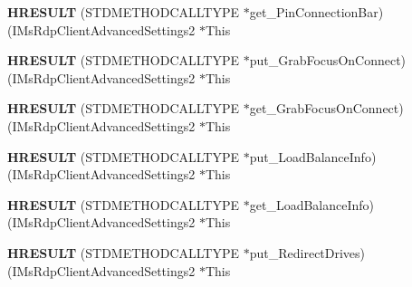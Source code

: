 \begin{DoxyCompactItemize}
\item 
\mbox{\label{struct_i_ms_rdp_client_advanced_settings2_vtbl_ad4f25ea9bf108e4c06acb5022e891fb0}} 
{\bfseries H\+R\+E\+S\+U\+LT} (S\+T\+D\+M\+E\+T\+H\+O\+D\+C\+A\+L\+L\+T\+Y\+PE $\ast$get\+\_\+\+Pin\+Connection\+Bar)(I\+Ms\+Rdp\+Client\+Advanced\+Settings2 $\ast$This
\item 
\mbox{\label{struct_i_ms_rdp_client_advanced_settings2_vtbl_aef44330913aeaa487c2fe85146e5cdf3}} 
{\bfseries H\+R\+E\+S\+U\+LT} (S\+T\+D\+M\+E\+T\+H\+O\+D\+C\+A\+L\+L\+T\+Y\+PE $\ast$put\+\_\+\+Grab\+Focus\+On\+Connect)(I\+Ms\+Rdp\+Client\+Advanced\+Settings2 $\ast$This
\item 
\mbox{\label{struct_i_ms_rdp_client_advanced_settings2_vtbl_a691e3f4879fa7ddb300e7033fb3df2b7}} 
{\bfseries H\+R\+E\+S\+U\+LT} (S\+T\+D\+M\+E\+T\+H\+O\+D\+C\+A\+L\+L\+T\+Y\+PE $\ast$get\+\_\+\+Grab\+Focus\+On\+Connect)(I\+Ms\+Rdp\+Client\+Advanced\+Settings2 $\ast$This
\item 
\mbox{\label{struct_i_ms_rdp_client_advanced_settings2_vtbl_a34c58ef6e8d8c506f66789017cc3a981}} 
{\bfseries H\+R\+E\+S\+U\+LT} (S\+T\+D\+M\+E\+T\+H\+O\+D\+C\+A\+L\+L\+T\+Y\+PE $\ast$put\+\_\+\+Load\+Balance\+Info)(I\+Ms\+Rdp\+Client\+Advanced\+Settings2 $\ast$This
\item 
\mbox{\label{struct_i_ms_rdp_client_advanced_settings2_vtbl_a89f97f7fdb99e206e89f53cea28aaee1}} 
{\bfseries H\+R\+E\+S\+U\+LT} (S\+T\+D\+M\+E\+T\+H\+O\+D\+C\+A\+L\+L\+T\+Y\+PE $\ast$get\+\_\+\+Load\+Balance\+Info)(I\+Ms\+Rdp\+Client\+Advanced\+Settings2 $\ast$This
\item 
\mbox{\label{struct_i_ms_rdp_client_advanced_settings2_vtbl_a6a695dc7141d51eb29544938e37b0e44}} 
{\bfseries H\+R\+E\+S\+U\+LT} (S\+T\+D\+M\+E\+T\+H\+O\+D\+C\+A\+L\+L\+T\+Y\+PE $\ast$put\+\_\+\+Redirect\+Drives)(I\+Ms\+Rdp\+Client\+Advanced\+Settings2 $\ast$This
\item 
\mbox{\label{struct_i_ms_rdp_client_advanced_settings2_vtbl_a634a01e88f1ccb9d2fb281c6439be7f2}} 

\end{DoxyCompactItemize}
